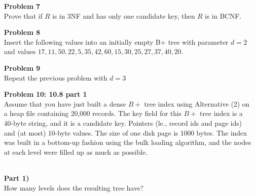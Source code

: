 \documentclass[12pt,letter]{article}
\newcommand{\problem}[1]{\vspace{3mm}\Large\textbf{{Problem
{#1}\vspace{3mm}}}\normalsize\\}
\newcommand{\ppart}[1]{\vspace{2mm}\large\textbf{\\Part
{#1})\vspace{2mm}}\normalsize\\}
\begin{document}
\problem{7}
Prove that if $R$ is in 3NF and has only one candidate key, then $R$ is in BCNF.

\problem{8}
Insert the following values into an initially empty B+ tree with parameter $d=2$
and values $17, 11, 50, 22, 5, 35, 42, 60, 15, 30, 25, 27, 37, 40, 20$.

\problem{9}
Repeat the previous problem with $d=3$

\problem{10: 10.8 part 1}
Assume that you have just built a dense $B+$ tree index using Alternative (2) on
a heap file containing 20,000 records. The key field for this $B+$ tree index is
a 40-byte string, and it is a candidate key. Pointers (le., record ids and page
ids) and (at most) 10-byte values. The size of one disk page is 1000 bytes. The
index was built in a bottom-up fashion using the bulk loading algorithm, and the
nodes at each level were filled up as much as possible.

\ppart{1}
How many levels does the resulting tree have?
\end{document}
